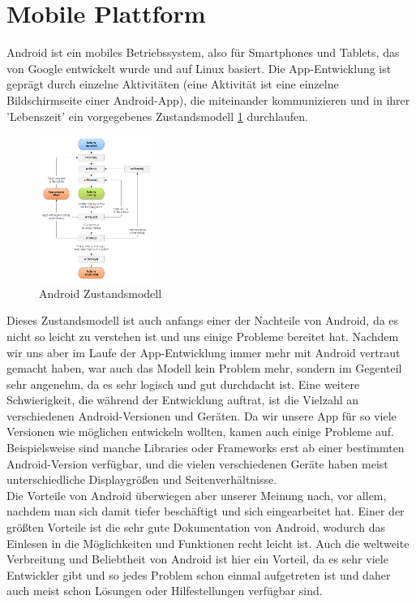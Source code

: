 \section{Mobile Plattform}
\label{sec:grundlagen:plattforml}

Android ist ein mobiles Betriebssystem, also für Smartphones und Tablets, das von Google entwickelt wurde und auf Linux basiert. Die App-Entwicklung ist geprägt durch einzelne Aktivitäten (eine Aktivität ist eine einzelne Bildschirmseite einer Android-App), die miteinander kommunizieren und in ihrer 'Lebenszeit' ein vorgegebenes Zustandsmodell \ref{figure:androidZustandsmodell} durchlaufen.

\begin{figure}[htp]
	\centering
  	\includegraphics[width=0.33\textwidth]{img/modelle/AndroidZustandsmodell.png}
	\caption[Android Zustandsmodell]{Android Zustandsmodell\protect\footnotemark}
	\label{figure:androidZustandsmodell}
\end{figure}

Dieses Zustandsmodell ist auch anfangs einer der Nachteile von Android, da es nicht so leicht zu verstehen ist und uns einige Probleme bereitet hat. Nachdem wir uns aber im Laufe der App-Entwicklung immer mehr mit Android vertraut gemacht haben, war auch das Modell kein Problem mehr, sondern im Gegenteil sehr angenehm, da es sehr logisch und gut durchdacht ist. Eine weitere Schwierigkeit, die während der Entwicklung auftrat, ist die Vielzahl an verschiedenen Android-Versionen und Geräten. Da wir unsere App für so viele Versionen wie möglichen entwickeln wollten, kamen auch einige Probleme auf. Beispielsweise sind manche Libraries oder Frameworks erst ab einer bestimmten Android-Version verfügbar, und die vielen verschiedenen Geräte haben meist unterschiedliche Displaygrößen und Seitenverhältnisse.\\
Die Vorteile von Android überwiegen aber unserer Meinung nach, vor allem, nachdem man sich damit tiefer beschäftigt und sich eingearbeitet hat. Einer der größten Vorteile ist die sehr gute Dokumentation von Android, wodurch das Einlesen in die Möglichkeiten und Funktionen recht leicht ist. Auch die weltweite Verbreitung und Beliebtheit von Android ist hier ein Vorteil, da es sehr viele Entwickler gibt und so jedes Problem schon einmal aufgetreten ist und daher auch meist schon Lösungen oder Hilfestellungen verfügbar sind.

